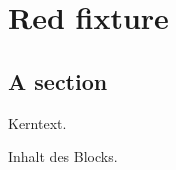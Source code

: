 \chapter{Red fixture}\label{c98}

\section{A section}\label{c98.s1}

Kerntext.

\begin{vertiefung}[id=c98.v1, titel={Titel}, wozu={Wozu.}, voraussetzung={Nichts.}, zurueck={Zurück.}]
Inhalt des Blocks.
\end{vertiefung}
